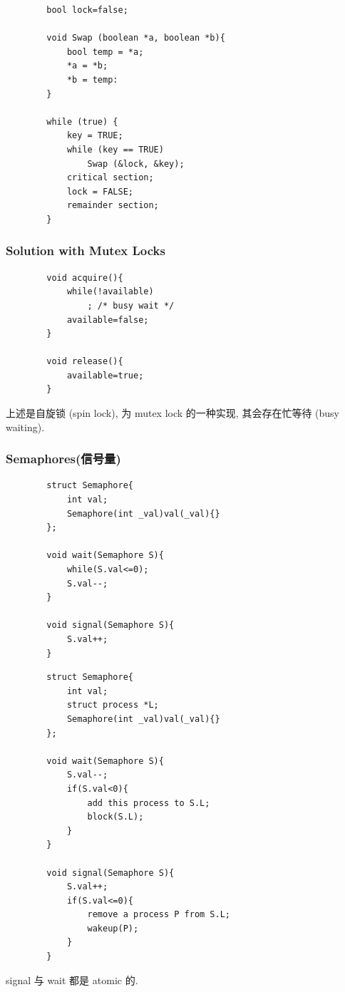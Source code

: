 \begin{code}
    \begin{verbatim}
        bool lock=false;

        void Swap (boolean *a, boolean *b){
            bool temp = *a;
            *a = *b;
            *b = temp:
        }

        while (true) {
            key = TRUE;
            while (key == TRUE)
                Swap (&lock, &key);
            critical section;
            lock = FALSE;
            remainder section;
        }
    \end{verbatim}
    \caption{Swap}
\end{code}

\subsubsection{Solution with Mutex Locks}
\begin{code}
    \begin{verbatim}
        void acquire(){
            while(!available)
                ; /* busy wait */
            available=false;
        }

        void release(){
            available=true;
        }
    \end{verbatim}
    \caption{acquire and release}
\end{code}
上述是自旋锁 (spin lock),  为 mutex lock 的一种实现, 其会存在忙等待 (busy waiting). 
\subsubsection{Semaphores(信号量)}
\begin{code}
    \begin{verbatim}
        struct Semaphore{
            int val;
            Semaphore(int _val)val(_val){}
        };

        void wait(Semaphore S){
            while(S.val<=0);
            S.val--;
        }

        void signal(Semaphore S){
            S.val++;
        }
    \end{verbatim}
    \caption{Semaphores with busy waiting}
\end{code}

\begin{code}
    \begin{verbatim}
        struct Semaphore{
            int val;
            struct process *L;
            Semaphore(int _val)val(_val){}
        };

        void wait(Semaphore S){
            S.val--;
            if(S.val<0){
                add this process to S.L;
                block(S.L);
            }
        }

        void signal(Semaphore S){
            S.val++;
            if(S.val<=0){
                remove a process P from S.L;
                wakeup(P);
            }
        }
    \end{verbatim}
    \caption{Semaphores without busy waiting}
\end{code}
signal 与 wait 都是 atomic 的. 

